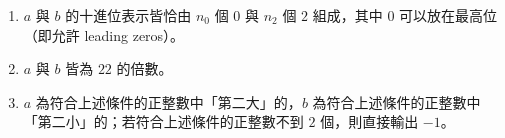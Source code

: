 \begin{enumerate}
\def\labelenumi{\arabic{enumi}.}
\tightlist
\item
  \begin{math}a\end{math} 與 \begin{math}b\end{math} 的十進位表示皆恰由
  \begin{math}n_0\end{math} 個 \begin{math}0\end{math} 與
  \begin{math}n_2\end{math} 個 \begin{math}2\end{math} 組成，其中
  \begin{math}0\end{math} 可以放在最高位（即允許 leading zeros）。
\item
  \begin{math}a\end{math} 與 \begin{math}b\end{math} 皆為
  \begin{math}22\end{math} 的倍數。
\item
  \begin{math}a\end{math}
  為符合上述條件的正整數中「第二大」的，\begin{math}b\end{math}
  為符合上述條件的正整數中「第二小」的；若符合上述條件的正整數不到
  \begin{math}2\end{math} 個，則直接輸出 \begin{math}-1\end{math}。
\end{enumerate}

